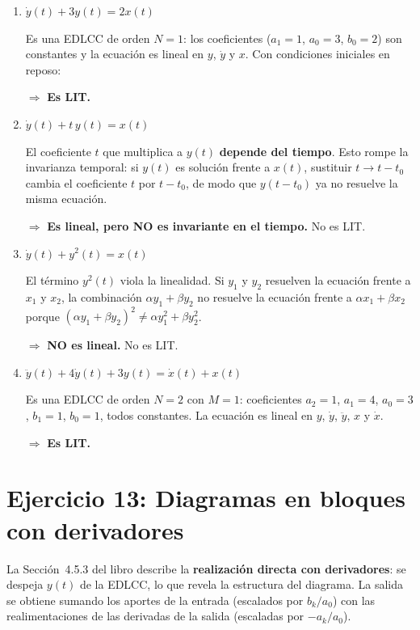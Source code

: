 \documentclass[10pt,a4paper]{article}
\begin{document}
	\begin{enumerate}[label=\textbf{\alph*)}]
		\item $\dot{y}(t) + 3y(t) = 2x(t)$
		
		Es una EDLCC de orden $N = 1$: los coeficientes ($a_1 = 1$, $a_0 = 3$, $b_0 = 2$) son constantes y la ecuación es lineal en $y$, $\dot{y}$ y $x$. Con condiciones iniciales en reposo:
		
		$\Rightarrow$ \textbf{Es LIT.}
		
		\item $\dot{y}(t) + t\,y(t) = x(t)$
		
		El coeficiente $t$ que multiplica a $y(t)$ \textbf{depende del tiempo}. Esto rompe la invarianza temporal: si $y(t)$ es solución frente a $x(t)$, sustituir $t \to t - t_0$ cambia el coeficiente $t$ por $t - t_0$, de modo que $y(t-t_0)$ ya no resuelve la misma ecuación.
		
		$\Rightarrow$ \textbf{Es lineal, pero NO es invariante en el tiempo.} No es LIT.
		
		\item $\dot{y}(t) + y^2(t) = x(t)$
		
		El término $y^2(t)$ viola la linealidad. Si $y_1$ y $y_2$ resuelven la ecuación frente a $x_1$ y $x_2$, la combinación $\alpha y_1 + \beta y_2$ no resuelve la ecuación frente a $\alpha x_1 + \beta x_2$ porque $(\alpha y_1 + \beta y_2)^2 \neq \alpha y_1^2 + \beta y_2^2$.
		
		$\Rightarrow$ \textbf{NO es lineal.} No es LIT.
		
		\item $\ddot{y}(t) + 4\dot{y}(t) + 3y(t) = \dot{x}(t) + x(t)$
		
		Es una EDLCC de orden $N = 2$ con $M = 1$: coeficientes $a_2 = 1$, $a_1 = 4$, $a_0 = 3$, $b_1 = 1$, $b_0 = 1$, todos constantes. La ecuación es lineal en $y$, $\dot{y}$, $\ddot{y}$, $x$ y $\dot{x}$.
		
		$\Rightarrow$ \textbf{Es LIT.}
	\end{enumerate}

	\section*{Ejercicio 13: Diagramas en bloques con derivadores}
	
	La Sección~4.5.3 del libro describe la \textbf{realización directa con derivadores}: se despeja $y(t)$ de la EDLCC, lo que revela la estructura del diagrama. La salida se obtiene sumando los aportes de la entrada (escalados por $b_k/a_0$) con las realimentaciones de las derivadas de la salida (escaladas por $-a_k/a_0$).
	
\end{document}
